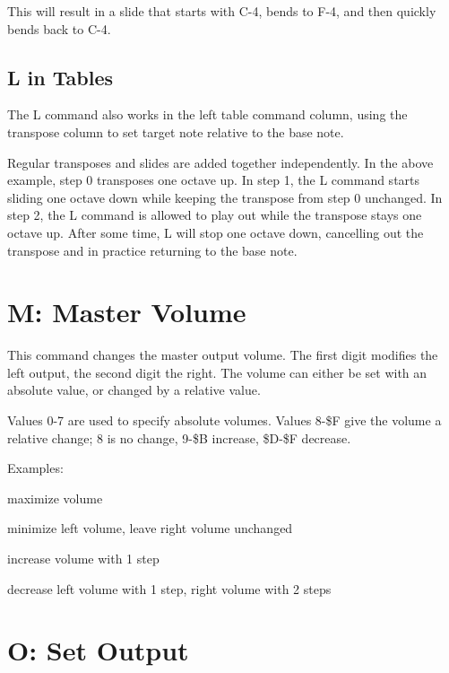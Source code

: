 This will result in a slide that starts with C-4, bends to F-4, and then quickly bends back to C-4.

\subsection{L in Tables}

The L command also works in the left table command column, using the transpose column to set target note relative to the base note.

\begin{figure}[htbp]
	\begin{center}
	\end{center}
\end{figure}

Regular transposes and slides are added together independently. In the above example, step 0 transposes one octave up. In step 1, the L command starts sliding one octave down while keeping the transpose from step 0 unchanged. In step 2, the L command is allowed to play out while the transpose stays one octave up. After some time, L will stop one octave down, cancelling out the transpose and in practice returning to the base note.

\section{M: Master Volume}

This command changes the master output volume. The first digit modifies the left output, the second digit the right. The volume can either be set with an absolute value, or changed by a relative value.

Values 0-7 are used to specify absolute volumes. Values 8-\$F give the volume a relative change; 8 is no change, 9-\$B increase, \$D-\$F decrease.

\begin{description}
\item Examples:
\item[M77] maximize volume
\item[M08] minimize left volume, leave right volume unchanged
\item[M99] increase volume with 1 step
\item[MFE] decrease left volume with 1 step, right volume with 2 steps
\end{description}

\section{O: Set Output}

